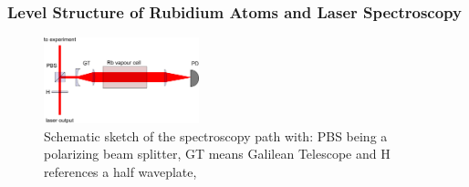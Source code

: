 \documentclass[12pt, a4paper]{article}
\begin{document}
\subsubsection{Level Structure of Rubidium Atoms and Laser Spectroscopy}
\begin{figure}
    \centering
    \parbox{0.4\textwidth}{
        \centering
        \includegraphics[width=0.4\textwidth]{800px-Doppler_spectroscopy.png}
    }

    \caption{Schematic sketch of the spectroscopy path with:  PBS being a polarizing beam splitter, GT means Galilean Telescope and H references a half waveplate, \cite{script}}
    \label{doppler_spect}
\end{figure}
\end{document}
